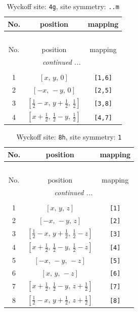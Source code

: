 \documentclass[fleqn,8pt]{jsarticle}
\begin{document}
\renewcommand{\arraystretch}{1.2}
\begin{longtable}{ccc}
\caption{Wyckoff site: {\tt 4g}, site symmetry: {\tt ..m}}
 \\
 \hline \hline
No. & position & mapping \\ \hline \endfirsthead

\multicolumn{2}{l}{\tablename\ \thetable{}} \\
 \hline \hline
No. & position & mapping \\ \hline \endhead

 \hline \hline
\multicolumn{2}{r}{\footnotesize\it continued ...} \\ \endfoot

 \hline \hline
\multicolumn{2}{r}{} \\ \endlastfoot

1 & $\left[ x,\, y,\, 0 \right]$ & {\tt [1,6]} \\ \hline
2 & $\left[ - x,\, - y,\, 0 \right]$ & {\tt [2,5]} \\ \hline
3 & $\left[ \frac{1}{2} - x,\, y + \frac{1}{2},\, \frac{1}{2} \right]$ & {\tt [3,8]} \\ \hline
4 & $\left[ x + \frac{1}{2},\, \frac{1}{2} - y,\, \frac{1}{2} \right]$ & {\tt [4,7]} \\
\end{longtable}
\renewcommand{\arraystretch}{1.2}
\begin{longtable}{ccc}
\caption{Wyckoff site: {\tt 8h}, site symmetry: {\tt 1}}
 \\
 \hline \hline
No. & position & mapping \\ \hline \endfirsthead

\multicolumn{2}{l}{\tablename\ \thetable{}} \\
 \hline \hline
No. & position & mapping \\ \hline \endhead

 \hline \hline
\multicolumn{2}{r}{\footnotesize\it continued ...} \\ \endfoot

 \hline \hline
\multicolumn{2}{r}{} \\ \endlastfoot

1 & $\left[ x,\, y,\, z \right]$ & {\tt [1]} \\ \hline
2 & $\left[ - x,\, - y,\, z \right]$ & {\tt [2]} \\ \hline
3 & $\left[ \frac{1}{2} - x,\, y + \frac{1}{2},\, \frac{1}{2} - z \right]$ & {\tt [3]} \\ \hline
4 & $\left[ x + \frac{1}{2},\, \frac{1}{2} - y,\, \frac{1}{2} - z \right]$ & {\tt [4]} \\ \hline
5 & $\left[ - x,\, - y,\, - z \right]$ & {\tt [5]} \\ \hline
6 & $\left[ x,\, y,\, - z \right]$ & {\tt [6]} \\ \hline
7 & $\left[ x + \frac{1}{2},\, \frac{1}{2} - y,\, z + \frac{1}{2} \right]$ & {\tt [7]} \\ \hline
8 & $\left[ \frac{1}{2} - x,\, y + \frac{1}{2},\, z + \frac{1}{2} \right]$ & {\tt [8]} \\
\end{longtable}
\end{document}
